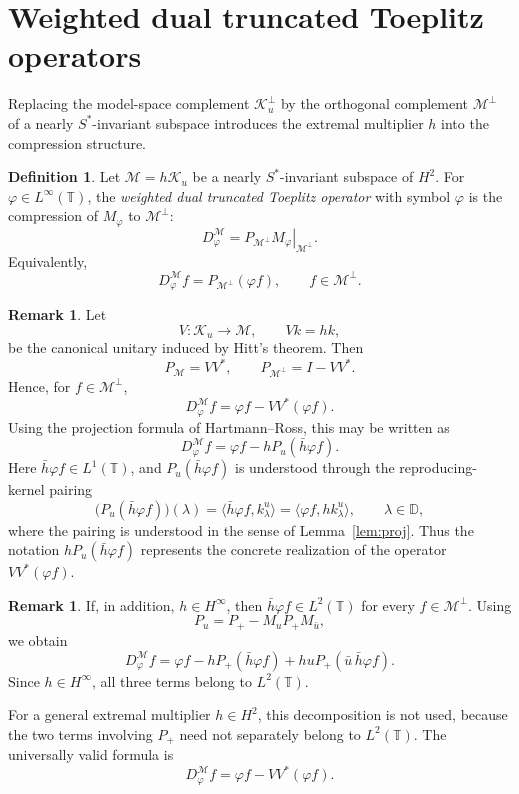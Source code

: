 \documentclass[12pt]{amsart}
\theoremstyle{definition}
\newtheorem{definition}[theorem]{Definition}
\newtheorem{remark}[theorem]{Remark}
\theoremstyle{remark}
\def \D{\mathbb{D}}
\def \T{\mathbb{T}}
\newcommand{\clm}{\mathcal{M}}
\newcommand{\clk}{\mathcal{K}}
\newcommand{\vp}{\varphi}
\newcommand\restr[2]{\ensuremath{\left.#1\right|_{#2}}}
\numberwithin{equation}{section}
\begin{document}
\section{Weighted dual truncated Toeplitz operators}

Replacing the model-space complement $\clk_u^\perp$ by the orthogonal complement $\clm^\perp$ of a nearly $S^*$-invariant subspace introduces the extremal multiplier $h$ into the compression structure.

\begin{definition}\label{def:weighted_DTTO}
Let $\clm=h\clk_u$ be a nearly $S^*$-invariant subspace of $H^2$. For $\vp\in L^\infty(\T)$, the \emph{weighted dual truncated Toeplitz operator} with symbol $\vp$ is the compression of $M_\vp$ to $\clm^\perp$:
\[
D_\vp^{\clm}=\restr{P_{\clm^\perp}M_\vp}{\clm^\perp}.
\]
Equivalently,
\[
D_\vp^{\clm}f
=
P_{\clm^\perp}(\vp f),
\qquad f\in\clm^\perp .
\]
\end{definition}

\begin{remark}
Let
\[
V:\clk_u\to\clm,\qquad Vk=hk,
\]
be the canonical unitary induced by Hitt's theorem. Then
\[
P_\clm=VV^*,
\qquad
P_{\clm^\perp}=I-VV^*.
\]
Hence, for $f\in\clm^\perp$,
\[
D_\vp^{\clm}f
=
\vp f-VV^*(\vp f).
\]
Using the projection formula of Hartmann--Ross, this may be written as
\[
D_\vp^{\clm}f
=
\vp f-hP_u(\bar h\vp f).
\]
Here $\bar h\vp f\in L^1(\T)$, and $P_u(\bar h\vp f)$ is understood through the reproducing-kernel pairing
\[
\big(P_u(\bar h\vp f)\big)(\lambda)
=
\langle \bar h\vp f,k_\lambda^u\rangle
=
\langle \vp f,hk_\lambda^u\rangle,
\qquad \lambda\in\D,
\]
where the pairing is understood in the sense of
Lemma~\ref{lem:proj}. Thus the notation $hP_u(\bar h\vp f)$ represents the concrete realization of the operator $VV^*(\vp f)$.
\end{remark}

\begin{remark}
If, in addition, $h\in H^\infty$, then
$\bar h\vp f\in L^2(\T)$ for every $f\in\clm^\perp$. Using
\[
P_u=P_+-M_uP_+M_{\bar u},
\]
we obtain
\[
D_\vp^\clm f
= \vp f - hP_+(\bar h\vp f) + huP_+(\bar u\,\bar h\vp f).
\]
Since $h\in H^\infty$, all three terms belong to $L^2(\T)$.

For a general extremal multiplier $h\in H^2$, this decomposition is not
used, because the two terms involving $P_+$ need not separately belong to $L^2(\T)$. The universally valid formula is
\[
D_\vp^\clm f=\vp f-VV^*(\vp f).
\]
\end{remark}
\end{document}
